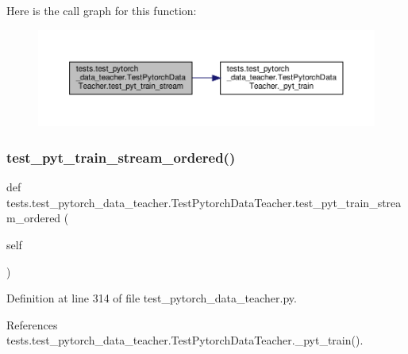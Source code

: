 Here is the call graph for this function\+:
\nopagebreak
\begin{figure}[H]
\begin{center}
\leavevmode
\includegraphics[width=350pt]{classtests_1_1test__pytorch__data__teacher_1_1TestPytorchDataTeacher_a3d14342d0d8a931821b223111e383d8e_cgraph}
\end{center}
\end{figure}
\mbox{\label{classtests_1_1test__pytorch__data__teacher_1_1TestPytorchDataTeacher_a1ccb0839b1de7c220c5b53e73d4f9ae1}} 
\subsubsection{\texorpdfstring{test\+\_\+pyt\+\_\+train\+\_\+stream\+\_\+ordered()}{test\_pyt\_train\_stream\_ordered()}}
{\footnotesize\ttfamily def tests.\+test\+\_\+pytorch\+\_\+data\+\_\+teacher.\+Test\+Pytorch\+Data\+Teacher.\+test\+\_\+pyt\+\_\+train\+\_\+stream\+\_\+ordered (\begin{DoxyParamCaption}\item[{}]{self }\end{DoxyParamCaption})}



Definition at line 314 of file test\+\_\+pytorch\+\_\+data\+\_\+teacher.\+py.



References tests.\+test\+\_\+pytorch\+\_\+data\+\_\+teacher.\+Test\+Pytorch\+Data\+Teacher.\+\_\+pyt\+\_\+train().

